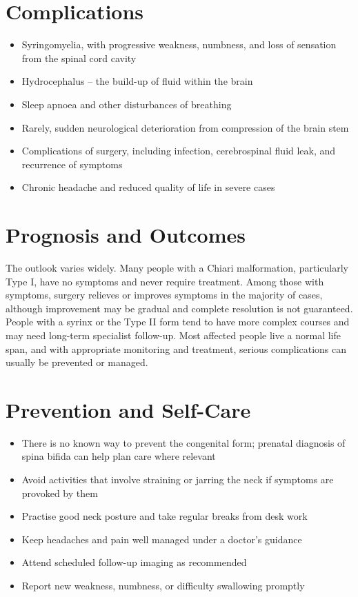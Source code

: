 \section*{Complications}
\begin{itemize}
    \item Syringomyelia, with progressive weakness, numbness, and loss of sensation from the spinal cord cavity
    \item Hydrocephalus -- the build-up of fluid within the brain
    \item Sleep apnoea and other disturbances of breathing
    \item Rarely, sudden neurological deterioration from compression of the brain stem
    \item Complications of surgery, including infection, cerebrospinal fluid leak, and recurrence of symptoms
    \item Chronic headache and reduced quality of life in severe cases
\end{itemize}

\section*{Prognosis and Outcomes}
The outlook varies widely. Many people with a Chiari malformation, particularly Type I, have no symptoms and never require treatment. Among those with symptoms, surgery relieves or improves symptoms in the majority of cases, although improvement may be gradual and complete resolution is not guaranteed. People with a syrinx or the Type II form tend to have more complex courses and may need long-term specialist follow-up. Most affected people live a normal life span, and with appropriate monitoring and treatment, serious complications can usually be prevented or managed.

\section*{Prevention and Self-Care}
\begin{itemize}
    \item There is no known way to prevent the congenital form; prenatal diagnosis of spina bifida can help plan care where relevant
    \item Avoid activities that involve straining or jarring the neck if symptoms are provoked by them
    \item Practise good neck posture and take regular breaks from desk work
    \item Keep headaches and pain well managed under a doctor's guidance
    \item Attend scheduled follow-up imaging as recommended
    \item Report new weakness, numbness, or difficulty swallowing promptly
\end{itemize}

